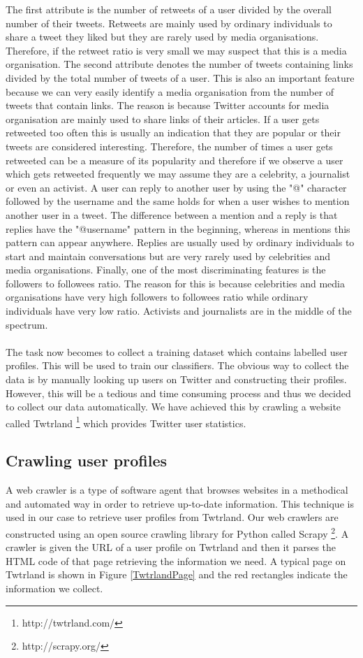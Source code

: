 The first attribute is the number of retweets of a user divided by the overall number of their tweets. Retweets are mainly used by ordinary individuals to share a tweet they liked but they are rarely used by media organisations. Therefore, if the retweet ratio is very small we may suspect that this is a media organisation. The second attribute denotes the number of tweets containing links divided by the total number of tweets of a user. This is also an important feature because we can very easily identify a media organisation from the number of tweets that contain links. The reason is because Twitter accounts for media organisation are mainly used to share links of their articles. If a user gets retweeted too often this is usually an indication that they are popular or their tweets are considered interesting. Therefore, the number of times a user gets retweeted can be a measure of its popularity and therefore if we observe a user which gets retweeted frequently we may assume they are a celebrity, a journalist or even an activist. A user can reply to another user by using the "@" character followed by the username and the same holds for when a user wishes to mention another user in a tweet. The difference between a mention and a reply is that replies have the "@username" pattern in the beginning, whereas in mentions this pattern can appear anywhere. Replies are usually used by ordinary individuals to start and maintain conversations but are very rarely used by celebrities and media organisations. Finally, one of the most discriminating features is the followers to followees ratio. The reason for this is because celebrities and media organisations have very high followers to followees ratio while ordinary individuals have very low ratio. Activists and journalists are in the middle of the spectrum.\\\\
The task now becomes to collect a training dataset which contains labelled user profiles. This will be used to train our classifiers. The obvious way to collect the data is by manually looking up users on Twitter and constructing their profiles. However, this will be a tedious and time consuming process and thus we decided to collect our data automatically. We have achieved this by crawling a website called Twtrland \footnote{http://twtrland.com/} which provides Twitter user statistics.   

\subsection{Crawling user profiles}
A web crawler is a type of software agent that browses websites in a methodical and automated way in order to retrieve up-to-date information. This technique is used in our case to retrieve user profiles from Twtrland. Our web crawlers are constructed using an open source crawling library for Python called Scrapy \footnote{http://scrapy.org/}. A crawler is given the URL of a user profile on Twtrland and then it parses the HTML code of that page retrieving the information we need. A typical page on Twtrland is shown in Figure \ref{TwtrlandPage} and the red rectangles indicate the information we collect. 

